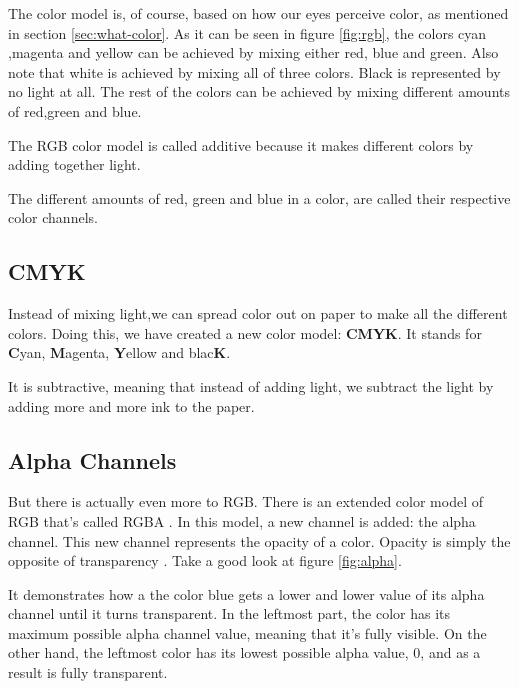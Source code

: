 \begin{refsection}
  The color model is, of course, based on how our eyes perceive color,
  as mentioned in section \ref{sec:what-color}. As it can be seen in
  figure \ref{fig:rgb}, the colors cyan ,magenta and yellow can
  be achieved by mixing either red, blue and green. Also note that
  white is achieved by mixing all of three colors. Black is
  represented by no light at all. The rest of the colors can be
  achieved by mixing different amounts of red,green and blue.

  The RGB color model is called additive
  because it makes different colors by adding together light.

  The different amounts of red, green and blue in a color, are called
  their respective color channels.

  \subsection{CMYK}
  \label{sec:cmyk}

  Instead of mixing light,we can spread color out on paper to make all
  the different colors. Doing this, we have created a new color model:
  \textbf{CMYK}. It stands for \textbf{C}yan,
  \textbf{M}agenta, \textbf{Y}ellow and blac\textbf{K}.

  It is subtractive, meaning that
  instead of adding light, we subtract the light by adding more and
  more ink to the paper.

  \subsection{Alpha Channels}
  \label{sec:alpha_chan}

  But there is actually even more to RGB. There is an extended color
  model of RGB that's called RGBA . In this model, a new channel is
  added: the alpha channel. This new channel
  represents the opacity of a color. Opacity is simply the opposite of
  transparency \cite{porter84_compos_dig_img}. Take
  a good look at figure \ref{fig:alpha}.

  It demonstrates how a the color blue gets a lower and lower value of
  its alpha channel until it turns transparent. In the leftmost part,
  the color has its maximum possible alpha channel value, meaning that it's
  fully visible. On the other hand, the leftmost color has its lowest
  possible alpha value, $0$, and as a result is fully transparent.


\end{refsection}
